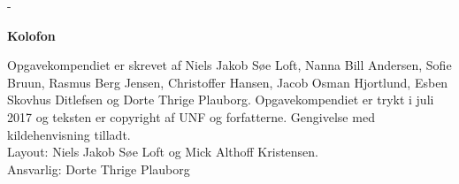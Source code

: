 \newpage


\begin{adjustwidth*}{\frontpagecorrection}{-\frontpagecorrection}
  \thispagestyle{empty}
  \strut
  \setlength{\parindent}{0pt}
  \addtolength{\parskip}{.6em}

  \vfill
    
  \begin{center}
    \bfseries Kolofon
  \end{center}
 
  \makeatletter
  \edef\fontandleading{\@memptsize.0/\the\baselineskip}
  \makeatother

  \small
   
  \textsl{\thesistitle}
    
  \smallskip
  
  Opgavekompendiet er skrevet af Niels Jakob Søe Loft, Nanna Bill Andersen, Sofie Bruun, Rasmus Berg Jensen, Christoffer Hansen, Jacob Osman Hjortlund, Esben Skovhus Ditlefsen og Dorte Thrige Plauborg. 
  Opgavekompendiet er trykt i juli 2017 og teksten er copyright
   af UNF og forfatterne. Gengivelse med kildehenvisning tilladt. \\
  Layout: Niels Jakob Søe Loft og Mick Althoff Kristensen.\\
  Ansvarlig: Dorte Thrige Plauborg
\end{adjustwidth*}




